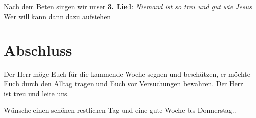 \documentclass{../inc/mybib}
\begin{document}
Nach dem Beten singen wir unser \textbf{3. Lied}: \textit{Niemand ist so treu und gut wie Jesus}\\
Wer will kann dann dazu aufstehen

\section{Abschluss}

Der Herr möge Euch für die kommende Woche segnen und beschützen, er möchte Euch durch den Alltag tragen und Euch vor Versuchungen bewahren. Der Herr ist treu und leite uns.

Wünsche einen schönen restlichen Tag und eine gute Woche bis Donnerstag..
\end{document}
